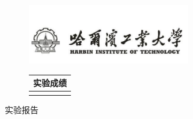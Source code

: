 \begin{titlepage}

    \begin{center}


        \begin{figure}[htbp]

            \begin{minipage}[b]{.5\linewidth}
                \includegraphics[width=7cm]{HIT.jpg}
            \end{minipage}
            \begin{minipage}[b]{.5\linewidth}
                \centering
                \begin{tabular}{|c|}
                    \hline
                    实验成绩\rule{0pt}{25pt} \\ \hline
                    \rule{0pt}{25pt}    \\ \hline
                \end{tabular}
            \end{minipage}
        \end{figure}

        \vfill




        {\fontsize{42pt}\baselineskip 实验报告}\\[5.5cm]





\end{center}
\end{titlepage}
